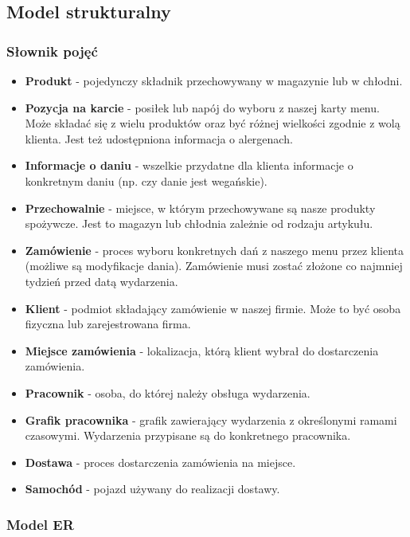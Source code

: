 \documentclass[12pt]{article}
\begin{document}
\subsection{Model strukturalny}

\subsubsection{Słownik pojęć}

\begin{itemize}
    \item \textbf{Produkt} - pojedynczy składnik przechowywany w magazynie lub w chłodni.
    \item \textbf{Pozycja na karcie} - posiłek lub napój do wyboru z naszej karty menu. Może składać się z wielu produktów oraz być różnej wielkości zgodnie z wolą klienta. Jest też udostępniona informacja o alergenach.
    \item \textbf{Informacje o daniu} - wszelkie przydatne dla klienta informacje o konkretnym daniu (np. czy danie jest wegańskie).
    \item \textbf{Przechowalnie} - miejsce, w którym przechowywane są nasze produkty spożywcze. Jest to magazyn lub chłodnia zależnie od rodzaju artykułu.
    \item \textbf{Zamówienie} - proces wyboru konkretnych dań z naszego menu przez klienta (możliwe są modyfikacje dania). Zamówienie musi zostać złożone co najmniej tydzień przed datą wydarzenia.
    \item \textbf{Klient} - podmiot składający zamówienie w naszej firmie. Może to być osoba fizyczna lub zarejestrowana firma.
    \item \textbf{Miejsce zamówienia} - lokalizacja, którą klient wybrał do dostarczenia zamówienia.
    \item \textbf{Pracownik} - osoba, do której należy obsługa wydarzenia.
    \item \textbf{Grafik pracownika} - grafik zawierający wydarzenia z określonymi ramami czasowymi. Wydarzenia przypisane są do konkretnego pracownika.
    \item \textbf{Dostawa} - proces dostarczenia zamówienia na miejsce.
    \item \textbf{Samochód} - pojazd używany do realizacji dostawy.
\end{itemize}

\subsubsection{Model ER}
\end{document}
